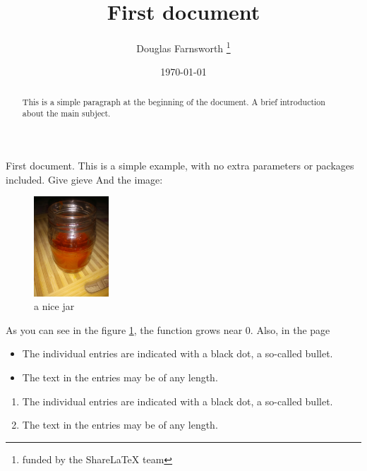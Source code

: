 \documentclass{abntex2}
\title{First document}
\author{Douglas Farnsworth \thanks{funded by the ShareLaTeX team}}
\date{\today }
\begin{document}
\maketitle

\begin{abstract}
This is a simple paragraph at the beginning of the 
document. A brief introduction about the main subject.
\end{abstract}

First document. This is a simple example, with no 
extra parameters or packages included.
Give gieve
And the image:
\begin{figure}[h]
    \centering
    \includegraphics[width=0.25\textwidth]{IMG_20170427_185824}
    \caption{a nice jar}
    \label{fig:jar}
\end{figure}
As you can see in the figure \ref{fig:jar}, the 
function grows near 0. Also, in the page \pageref{fig:jar}



\begin{itemize}
  \item The individual entries are indicated with a black dot, a so-called bullet.
  \item The text in the entries may be of any length.
\end{itemize}





\begin{enumerate}
  \item The individual entries are indicated with a black dot, a so-called bullet.
  \item The text in the entries may be of any length.
\end{enumerate}
\end{document}
